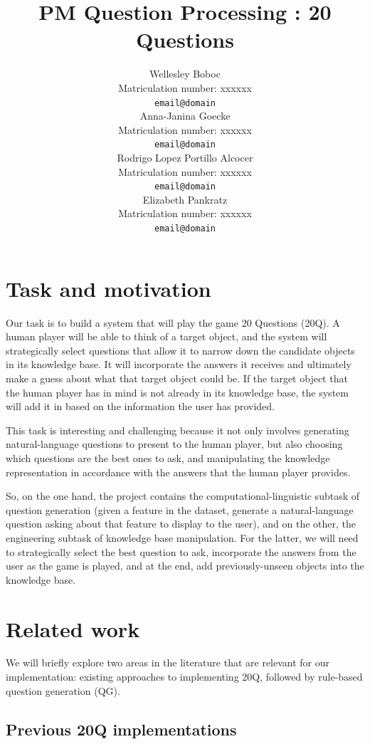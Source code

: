 \documentclass[11pt,a4paper]{article}
\title{PM Question Processing : 20 Questions}
\author{Wellesley Boboc \\
  Matriculation number: xxxxxx \\
  \texttt{email@domain} \\\And
  Anna-Janina Goecke \\
  Matriculation number: xxxxxx \\
  \texttt{email@domain} \\\AND
  Rodrigo Lopez Portillo Alcocer \\
  Matriculation number: xxxxxx \\
  \texttt{email@domain} \\\And
  Elizabeth Pankratz \\
  Matriculation number: xxxxxx \\
  \texttt{email@domain} \\}
\date{}
\begin{document}
\maketitle

\begin{abstract}
\lipsum[1]
\end{abstract}

\section{Task and motivation}

Our task is to build a system that will play the game 20 Questions (20Q).
A human player will be able to think of a target object, and the system will strategically select questions that allow it to narrow down the candidate objects in its knowledge base.
It will incorporate the answers it receives and ultimately make a guess about what that target object could be.
If the target object that the human player has in mind is not already in its knowledge base, the system will add it in based on the information the user has provided.

This task is interesting and challenging because it not only involves generating natural-language questions to present to the human player, but also choosing which questions are the best ones to ask, and manipulating the knowledge representation in accordance with the answers that the human player provides.

So, on the one hand, the project contains the computational-linguistic subtask of question generation (given a feature in the dataset, generate a natural-language question asking about that feature to display to the user), and on the other, the engineering subtask of knowledge base manipulation.
For the latter, we will need to strategically select the best question to ask, incorporate the answers from the user as the game is played, and at the end, add previously-unseen objects into the knowledge base.

\section{Related work}

We will briefly explore two areas in the literature that are relevant for our implementation: existing approaches to implementing 20Q, followed by rule-based question generation (QG).

\subsection{Previous 20Q implementations}
\end{document}
